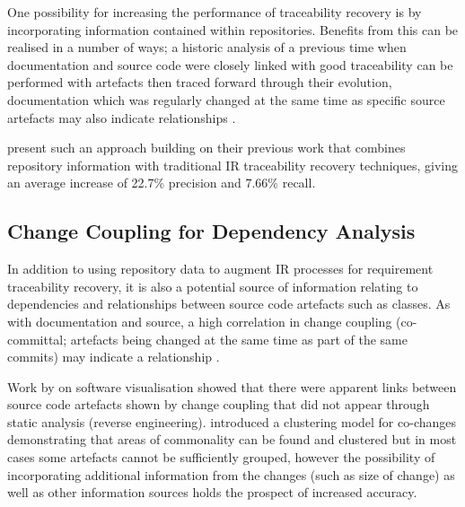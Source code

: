 One possibility for increasing the performance of traceability recovery is by incorporating information contained within repositories. Benefits from this can be realised in a number of ways; a historic analysis of a previous time when documentation and source code were closely linked with good traceability can be performed with artefacts then traced forward through their evolution, documentation which was regularly changed at the same time as specific source artefacts may also indicate relationships \citep{ali_trustrace:_2013,kagdi_mining_2007}.

\citet{ali_trustrace:_2013} present such an approach building on their previous work \citep{ali_trust-based_2011} that combines repository information with traditional IR traceability recovery techniques, giving an average increase of 22.7\% precision and 7.66\% recall.

\subsection{Change Coupling for Dependency Analysis}\label{lit-scm-cocomm}

In addition to using repository data to augment IR processes for requirement traceability recovery, it is also a potential source of information relating to dependencies and relationships between source code artefacts such as classes. As with documentation and source, a high correlation in change coupling (co-committal; artefacts being changed at the same time as part of the same commits) may indicate a relationship \citep{kagdi_survey_2007}. 

Work by \citet{bieman2003understanding} on software visualisation showed that there were apparent links between source code artefacts shown by change coupling that did not appear through static analysis (reverse engineering). \citet{beyer_clustering_2005} introduced a clustering model for co-changes demonstrating that areas of commonality can be found and clustered but in most cases some artefacts cannot be sufficiently grouped, however the possibility of incorporating additional information from the changes (such as size of change) as well as other information sources holds the prospect of increased accuracy.

